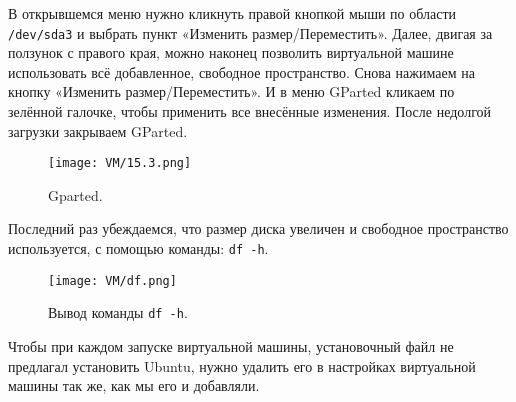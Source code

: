 В открывшемся меню нужно кликнуть правой кнопкой мыши по области \texttt{/dev/sda3} и выбрать пункт «Изменить размер/Переместить». Далее, двигая за ползунок с правого края, можно наконец позволить виртуальной машине использовать всё добавленное, свободное пространство. Снова нажимаем на кнопку «Изменить размер/Переместить». И в меню GParted  кликаем по зелённой галочке, чтобы применить все внесённые изменения. После недолгой загрузки закрываем GParted.

\begin{figure}[h]
		\centering
		\texttt{[image: VM/15.3.png]}
\caption{Gparted.}
\label{ris:image}
\end{figure}

Последний раз убеждаемся, что размер диска увеличен и свободное пространство используется, с помощью команды: \texttt{df -h}.

\begin{figure}[h]
		\centering
		\texttt{[image: VM/df.png]}
\caption{Вывод команды \texttt{df -h}.}
\label{ris:image}
\end{figure}

Чтобы при каждом запуске виртуальной машины, установочный файл не предлагал установить Ubuntu, нужно удалить его в настройках виртуальной машины так же, как мы его и добавляли.
